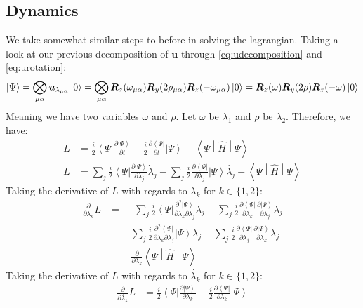 \documentclass{aux/ttuthes2007}
\newcommand{\bra}[1]{\ensuremath{\left\langle#1\right\vert}}
\newcommand{\ket}[1]{\ensuremath{\left|#1\right\rangle}}
\newcommand{\sandwich}[3]{\left< #1 \middle\vert #2 \middle\vert #3 \right>}
\newcommand{\pd}[1]{\frac{\partial}{\partial #1}}
\newcommand{\kpp}[1]{\frac{\partial \ket\Psi}{\partial #1}}
\newcommand{\bpp}[1]{\frac{\partial \bra\Psi}{\partial #1}}
\newcommand{\kppd}[2]{\frac{\partial^{2} \ket\Psi}{\partial #1 \partial #2}}
\newcommand{\bppd}[2]{\frac{\partial^{2} \bra\Psi}{\partial #1 \partial #2}}
\newcommand{\ind}[1]{{\uo #1 \oo #1}}
\newcommand{\uo}[1]{
		\IfEqCase{#1}{
			{0}{\mu}
			{1}{\nu}
			{2}{\xi}
		}[\PackageError{uo}{Undefined option to uo: #1}{}]
}
\newcommand{\oo}[1]{
		\IfEqCase{#1}{
			{0}{\alpha}
			{1}{\beta}
			{2}{\gamma}
		}[\PackageError{unocorb}{Undefined option to unuo: #1}{}]
}
\begin{document}
\subsection {\textbf{Dynamics}}
%
We take somewhat similar steps to before in solving the lagrangian. Taking a look at our previous decomposition of $\bm u$ through \ref{eq:udecomposition} and \ref{eq:urotation}:
\begin{equation*}
\begin{split}
	\ket\Psi 
	= \bigotimes_{\ind 0} 
		\bm u_{\lambda_{\ind 0}} \ket 0
	= \bigotimes_{\ind 0} 
		\bm R_z(\omega_{\ind 0}) \bm R_y(2\rho_\ind 0) \bm R_z(-\omega_\ind 0) \ket 0
	= \bm R_z(\omega) \bm R_y(2\rho) \bm R_z(-\omega) \ket 0
\end{split}
\end{equation*}
%
Meaning we have two variables $\omega$ and $\rho$. Let $\omega$ be $\lambda_1$ and $\rho$ be $\lambda_2$. Therefore, we have:
%
\begin{equation*}
	\begin{split}
		L &= \frac{i}{2}\bra{\Psi}{\kpp t} - \frac{i}{2}{\bpp{t}}\ket{\Psi} - \sandwich{\Psi}{\hat H}{\Psi} \\
	L &= 	
		\sum_j \frac{i}{2}\bra{\Psi}{\kpp {\lambda_j}} \dot \lambda_j
	- 	\sum_j \frac{i}{2}{\bpp{\lambda_j}}\ket{\Psi}\dot{\lambda_j}
	- \sandwich{\Psi}{\hat H}{\Psi}
	\end{split}
\end{equation*}
%
Taking the derivative of $L$ with regards to $\lambda_k$ for $k \in \{1, 2\}$:
%
\begin{equation*}
	\begin{split}
	\pd{\lambda_k} L &= 	
	\phantom{-}\sum_j \frac{i}{2}\bra{\Psi}{\kppd {\lambda_k}{\lambda_j}} \dot \lambda_j
	+	\sum_j \frac{i}{2}\bpp{\lambda_k}{\kpp {\lambda_j}} \dot \lambda_j \\
	&\quad -\sum_j \frac{i}{2}{\bppd{\lambda_k}{\lambda_j}}\ket{\Psi}\dot{\lambda_j}
	- 	\sum_j \frac{i}{2}{\bpp{\lambda_j}}\kpp{\lambda_k}\dot{\lambda_j}\\
	&\quad -\pd{\lambda_k} \sandwich{\Psi}{\hat H}{\Psi}
	\end{split}
\end{equation*}
%
Taking the derivative of $L$ with regards to $\dot{\lambda_k}$ for $k \in \{1, 2\}$:
%
\begin{equation*}
	\begin{split}
		\pd{\dot{\lambda_k}} L &=
		\frac{i}{2}\bra{\Psi}{\kpp {\lambda_k}}
	- 	\frac{i}{2}{\bpp{\lambda_k}}\ket{\Psi}
	\end{split}
\end{equation*}
\end{document}

